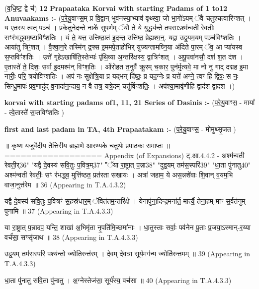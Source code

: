 \documentclass[17pt]{extarticle}
\begin{document}
                  \newline
                                                        (व॒धि॒ष्ट॒ द्वे च॑) \textbf{12} \newline \newline
\textbf{Prapaataka Korvai with starting Padams of 1 to12 Anuvaakams :-} \newline
(प॒रे॒यु॒वाꣳस॒म् प्र वि॒द्वान् भुव॑नस्या॒भ्याव॑ वृथ्स्वा॒ जो भा॒गो॑ऽयम् ॅवै चतुश्चत्वारिꣳशत् । य ए॒तस्य॒ त्वत् पञ्च॑ । प्रके॒तुने॒दन्ते॒ नाके॑ सुप॒र्णम् ॅयौ ते॒ ये युद्ध्य॑न्ते॒ तप॒साऽश्म॑न्वती रेवतीः॒ सꣳर॑भद्ध्वम॒ष्टाविꣳ॑शतिः । यं ते॒ यत्त॒ उत्तिष्ठा॒त॑ इ॒दन्त॒ उत्ति॑ष्ठ॒ प्रेह्यश्म॒न्॒. यद्वा उद्व॒यम॒यम् पञ्च॑विꣳशतिः । आया॑तु त्रिꣳ॒॒शत् । वै॒श्वा॒न॒रे तस्मि॑न् द्र॒फ्स इ॒ममपे॒ताहो॑भिर् युज्यन्तामघ्नि॒या अ॑दिते पा॒रम् ॅव॒ आ प्या॑यस्व स॒प्तविꣳ॑शतिः । उत्ते॑ गृहेऽखाषि॑ति॒स्तेभ्यः॑ पृ॑थि॒व्या अ॒न्तरि॑क्षस्य॒ द्वात्रिꣳ॑शत् । अ॒पू॒पवा॑नसौ॒ दश॑ श॒त द॑श । ए॒तास्ते॑ ते॒ दिशः॒ सर्वा॑ इ॒दमश्म॑न् विꣳश॒तिः । ओ॑रोहत त॒नुवै᳚ क्रू॒रम् च॒कार॒ पुन॑र्मृ॒त्यवे॒ मा नो नु॑ गाद् दद्मह इ॒मा नारीः॒ परि॒ त्रयो॑विꣳशतिः । अप॑ नः सुक्षेत्रि॒या प्र यद्भन् दि॑ष्ठः॒ प्र यद॒ग्नेः प्र यत्ते॑ अग्ने॒ त्वꣳ हि द्विषः॒ स नः॒ सिन्धु॒मापः॑ प्रव॒णादु॑द् व॒नादा॑न॒न्दाय॒ न वै तत्र॒ यत्रे॒दम् चतु॑र्विꣳशतिः॒ । अप॑श्या॒मावृ॑णीहि॒ द्वाद॑श द्वादश ।) \newline

\textbf{korvai with starting padams of1, 11, 21 Series of Dasinis :-} \newline
(प॒रे॒यु॒वाꣳस॒ - माया᳚ - त्वे॒तास्ते॑ स॒प्तविꣳ॑शतिः ) \newline

\textbf{first and last padam in TA, 4th Prapaatakam :-} \newline
(प॒रे॒यु॒वाꣳस॒ - मोमुथ्सृ॒जत ) \newline 


॥ कृष्ण यजुर्वेदीय तैत्तिरीय ब्राह्मणे आरण्यके चतुर्थः प्रपाठकः समाप्तः ॥
==================
Appendix (of Expansions)
ट्.आ.4.4.2 - अश्म॑न्वती रेवती॒र्{36}" "यद्वै दे॒वस्य॑ सवि॒तुः प॒वित्र॒म्{37}" "ॅया रा॒ष्ट्रात् प॒न्ना{38}" "दुद्व॒यम् तम॑स॒स्परि॑{39}" "धा॒ता पु॑नातु{40}" 
अश्म॑न्वती रेवतीः॒ सꣳ र॑भद्ध्व॒ मुत्ति॑ष्ठत॒ प्रत॑रता सखायः । अत्रा॑ जहाम॒ ये अस॒न्नशे॑वाः शि॒वान् व॒यम॒भि वाजा॒नुत्त॑रेम ॥ {36}
(Appearing in T.A.4.3.2)


यद्वै दे॒वस्य॑ सवि॒तुः प॒वित्रꣳ॑ स॒हस्र॑धार॒म् ॅवित॑तम॒न्तरि॑क्षे । येनापु॑ना॒दिन्द्र॒मना॑र्त॒-मार्त्यै॒ तेना॒हम् माꣳ स॒र्वत॑नुम् पुनामि ॥ {37}
(Appearing in T.A.4.3.3)

या रा॒ष्ट्रात् प॒न्नादप॒ यन्ति॒ शाखा॑ अ॒भिमृ॑ता नृ॒पति॑मि॒च्छमा॑नाः । धा॒तुस्ताः सर्वाः॒ पव॑नेन पू॒ताः प्र॒जया॒ऽस्मान्-र॒य्या वर्च॑सा॒ सꣳसृ॑जाथ ॥ {38} 
(Appearing in T.A.4.3.3)

उद्व॒यम् तम॑स॒स्परि॒ पश्य॑न्तो॒ ज्योति॒रुत्त॑रम् । दे॒वम् दे॑व॒त्रा सूर्य॒मग॑न्म॒ ज्योति॑रुत्त॒मम् ॥ {39} 
(Appearing in T.A.4.3.3)

धा॒ता पु॑नातु सवि॒ता पु॑नातु । अ॒ग्नेस्तेज॑सा॒ सूर्य॑स्य॒ वर्च॑सा ॥ {40}
(Appearing in T.A.4.3.3) \newline
\pagebreak
\pagebreak
        
\end{document}
